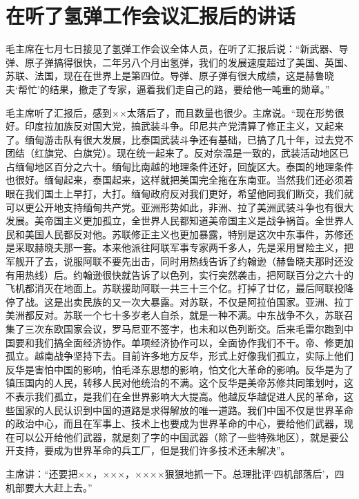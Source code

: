 \section[在听了氢弹工作会议汇报后的讲话（一九六七年七月七日）]{在听了氢弹工作会议汇报后的讲话}


毛主席在七月七日接见了氢弹工作会议全体人员，在听了汇报后说：“新武器、导弹、原子弹搞得很快，二年另八个月出氢弹，我们的发展速度超过了美国、英国、苏联、法国，现在在世界上是第四位。导弹、原子弹有很大成绩，这是赫鲁晓夫‘帮忙’的结果，撤走了专家，逼着我们走自己的路，要给他一吨重的勋章。”

毛主席听了汇报后，感到××太落后了，而且数量也很少。主席说。“现在形势很好。印度拉加族反对国大党，搞武装斗争。印尼共产党清算了修正主义，又起来了。缅甸游击队有很大发展，比泰国武装斗争还有基础，已搞了几十年，过去党不团结（红旗党、白旗党）。现在统一起来了。反对奈温是一致的，武装活动地区已占缅甸地区百分之六十。缅甸比南越的地理条件还好，回旋区大。泰国的地理条件也很好。缅甸起来，泰国起来，这样就把美国完全拖在东南亚。当然我们还必须着眼在我们国土上早打，大打。缅甸政府反对我们更好，希望他同我们断交，我们就可以更公开地支持缅甸共产党。亚洲形势如此，非洲、拉了美洲武装斗争也有很大发展。美帝国主义更加孤立，全世界人民都知道美帝国主义是战争祸首。全世界人民和美国人民都反对他。苏联修正主义也更加暴露，特别是这次中东事件，苏修还是采取赫晓夫那一套。本来他派往阿联军事专家两千多人，先是采用冒险主义，把军舰开了去，说服阿联不要先出击，同时用热线告诉了约翰逊（赫鲁晓夫那时还没有用热线）后。约翰逊很快就告诉了以色列，实行突然袭击，把阿联百分之六十的飞机都消灭在地面上。苏联援助阿联一共三十三个亿。打掉了廿亿，最后阿联投降停了战。这是出卖民族的又一次大暴露。对苏联，不仅是阿拉伯国家。亚洲、拉丁美洲都反对。苏联一个七十多岁老人自杀，就是一种不满。中东战争不久，苏联召集了三次东欧国家会议，罗马尼亚不签字，也未和以色列断交。后来毛雷尔跑到中国要和我们搞全面经济协作。单项经济协作可以，全面协作我们不干。帝、修更加孤立。越南战争坚持下去。目前许多地方反华，形式上好像我们孤立，实际上他们反华是害怕中国的影响，怕毛泽东思想的影响，怕文化大革命的影响。反华是为了镇压国内的人民，转移人民对他统治的不满。这个反华是美帝苏修共同策划吋，这不表示我们孤立，是我们在全世界影响大大提高。他越反华越促进人民的革命，这些国家的人民认识到中国的道路是求得解放的唯一道路。我们中国不仅是世界革命的政治中心，而且在军事上、技术上也要成为世界革命的中心，要给他们武器，现在可以公开给他们武器，就是刻了字的中国武器（除了一些特殊地区），就是要公开支持，要成为世界革命的兵工厂，但是我们许多技术还未解决”。

主席讲：“还要把××，×××，××××狠狠地抓一下。总理批评‘四机部落后’，四机部要大大赶上去。”


